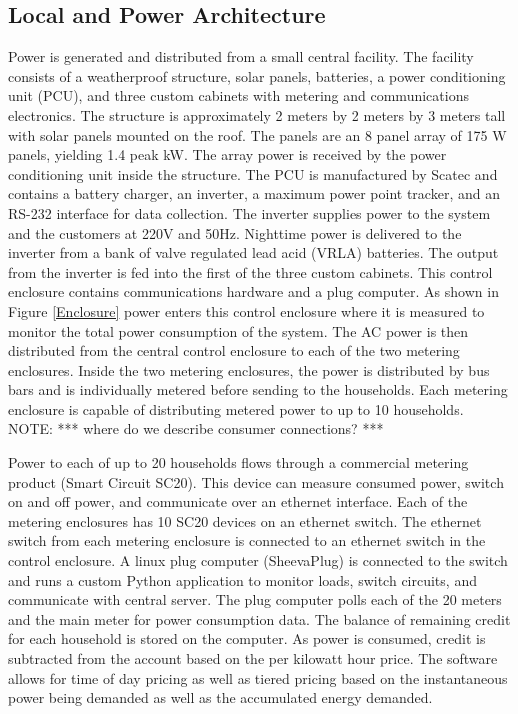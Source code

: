 \documentclass[conference]{IEEEtran}
\newcommand{\note}[1]{{\color{red} NOTE: *** #1 ***}}
\begin{document}
\subsection{Local and Power Architecture}
Power is generated and distributed from a small central facility.
The facility consists of a weatherproof structure, solar panels, 
batteries, a power conditioning unit (PCU), and three custom
cabinets with metering and communications electronics.
The structure is approximately 2 meters by 2 meters 
by 3 meters tall with solar panels mounted on the roof.
The panels are an 8 panel array of 175 W panels, yielding
1.4 peak kW.
The array power is received by the power conditioning unit 
inside the structure.  The PCU is manufactured by Scatec and 
contains a battery charger, an inverter, a maximum power point 
tracker, and an RS-232 interface for data collection.  
The inverter supplies power to the system and the 
customers at 220V and 50Hz.  Nighttime power is delivered to the
inverter from
a bank of valve regulated lead acid (VRLA) batteries.  
The output from the inverter is fed into the first of the three custom
cabinets.  This control enclosure contains communications hardware and
a plug computer.
As shown in 
Figure \ref{Enclosure} power enters this control enclosure where it 
is measured to monitor the total power consumption of the system.
The AC power is then distributed from the central 
control enclosure to each of the two metering enclosures.  
Inside the two
metering enclosures, the power is distributed by bus bars and is 
individually metered before sending to the households.  Each metering
enclosure is capable of distributing metered power to up to 10 households.
\note{where do we describe consumer connections?}

Power to each of up to 20 households flows through a commercial metering
product (Smart Circuit SC20).  This device can measure consumed power, 
switch on and off power, and communicate over an ethernet interface.
Each of the metering enclosures has 10 SC20 devices on an ethernet switch.
The ethernet switch from each metering enclosure is connected to an 
ethernet switch in the control enclosure.
A linux plug computer (SheevaPlug) is connected to the switch and runs 
a custom Python application to monitor loads, switch circuits, and communicate
with central server.
The plug computer polls each of the 20 meters and the main meter for power consumption data.
The balance of remaining credit for each household is stored on the computer.
As power is consumed, credit is subtracted from the account based on the 
per kilowatt hour price.
The software
allows for time of day pricing as well as tiered pricing based on
the instantaneous power being demanded as well as the accumulated energy
demanded.  
\end{document}

